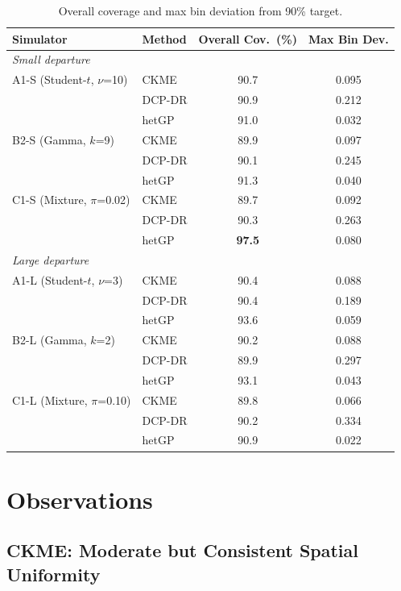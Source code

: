 \documentclass[11pt]{article}
\theoremstyle{remark}
\begin{document}
\begin{table}[htbp]
\centering
\caption{Overall coverage and max bin deviation from 90\% target.}
\label{tab:summary}
\begin{tabular}{ll cc}
\toprule
Simulator & Method & Overall Cov.\ (\%) & Max Bin Dev. \\
\midrule
\multicolumn{4}{l}{\emph{Small departure}} \\
A1-S (Student-$t$, $\nu$=10)
  & CKME   & 90.7 & 0.095 \\
  & DCP-DR & 90.9 & 0.212 \\
  & hetGP  & 91.0 & 0.032 \\
\addlinespace
B2-S (Gamma, $k$=9)
  & CKME   & 89.9 & 0.097 \\
  & DCP-DR & 90.1 & 0.245 \\
  & hetGP  & 91.3 & 0.040 \\
\addlinespace
C1-S (Mixture, $\pi$=0.02)
  & CKME   & 89.7 & 0.092 \\
  & DCP-DR & 90.3 & 0.263 \\
  & hetGP  & \textbf{97.5} & 0.080 \\
\midrule
\multicolumn{4}{l}{\emph{Large departure}} \\
A1-L (Student-$t$, $\nu$=3)
  & CKME   & 90.4 & 0.088 \\
  & DCP-DR & 90.4 & 0.189 \\
  & hetGP  & 93.6 & 0.059 \\
\addlinespace
B2-L (Gamma, $k$=2)
  & CKME   & 90.2 & 0.088 \\
  & DCP-DR & 89.9 & 0.297 \\
  & hetGP  & 93.1 & 0.043 \\
\addlinespace
C1-L (Mixture, $\pi$=0.10)
  & CKME   & 89.8 & 0.066 \\
  & DCP-DR & 90.2 & 0.334 \\
  & hetGP  & 90.9 & 0.022 \\
\bottomrule
\end{tabular}
\end{table}


\section{Observations}
\label{sec:observations}

\subsection{CKME: Moderate but Consistent Spatial Uniformity}
\end{document}
